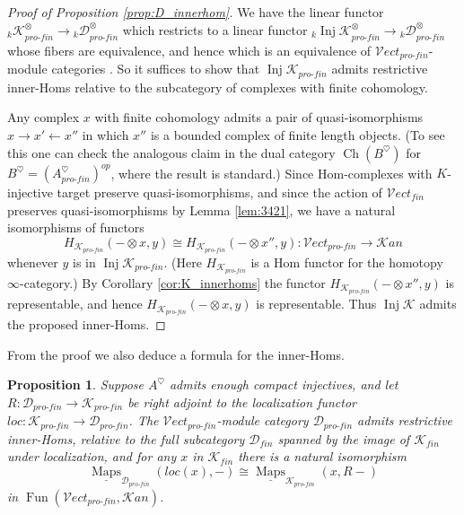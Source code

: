 \documentclass[reqno]{amsart}
\newtheorem{proposition}[lemma]{Proposition}
\theoremstyle{definition}
\newcommand{\msc}[1]{\mathscr{#1}}
\newcommand{\opn}[1]{\operatorname{#1}}
\newcommand{\ot}{\otimes}
\newcommand{\Vect}{\msc{V}\!ect}
\newcommand{\sKan}{\msc{K}\!an}
\newcommand{\pf}{pro\text{-}fin}
\DeclareMathOperator{\Fun}{Fun}
\DeclareMathOperator{\Maps}{Maps}
\renewcommand{\1}{\mathbf{1}}
\begin{document}
\begin{proof}[Proof of Proposition \ref{prop:D_innerhom}]
We have the linear functor ${_k\msc{K}}^{\ot}_{\pf}\to {_k\msc{D}}^{\ot}_{\pf}$ which restricts to a linear functor ${_k\opn{Inj}\msc{K}}^{\ot}_{\pf}\to {_k\msc{D}}^{\ot}_{\pf}$ whose fibers are equivalence, and hence which is an equivalence of $\Vect_{\pf}$-module categories \cite[\href{https://kerodon.net/tag/028C}{028C}]{kerodon}.  So it suffices to show that $\opn{Inj}\msc{K}_{\pf}$ admits restrictive inner-Homs relative to the subcategory of complexes with finite cohomology.
\par

Any complex $x$ with finite cohomology admits a pair of quasi-isomorphisms $x\to x'\leftarrow x''$ in which $x''$ is a bounded complex of finite length objects.  (To see this one can check the analogous claim in the dual category $\opn{Ch}(B^{\heartsuit})$ for $B^{\heartsuit}=(A^{\heartsuit}_{\pf})^{op}$, where the result is standard.)  Since Hom-complexes with $K$-injective target preserve quasi-isomorphisms, and since the action of $\Vect_{fin}$ preserves quasi-isomorphisms by Lemma \ref{lem:3421}, we have a natural isomorphisms of functors
\[
H_{\msc{K}_{\pf}}(-\ot x,y)\cong H_{\msc{K}_{\pf}}(-\ot x'',y):\Vect_{\pf}\to \sKan
\]
whenever $y$ is in $\opn{Inj}\msc{K}_{\pf}$.  (Here $H_{\msc{K}_{\pf}}$ is a Hom functor for the homotopy $\infty$-category.)  By Corollary \ref{cor:K_innerhoms} the functor $H_{\msc{K}_{\pf}}(-\ot x'',y)$ is representable, and hence $H_{\msc{K}_{\pf}}(-\ot x,y)$ is representable.  Thus $\opn{Inj}\msc{K}$ admits the proposed inner-Homs.
\end{proof}

From the proof we also deduce a formula for the inner-Homs.

\begin{proposition}\label{prop:D_innerhom_formula}
Suppose $A^{\heartsuit}$ admits enough compact injectives, and let $R:\msc{D}_{\pf}\to \msc{K}_{\pf}$ be right adjoint to the localization functor $loc:\msc{K}_{\pf}\to \msc{D}_{\pf}$.  The $\Vect_{\pf}$-module category $\msc{D}_{\pf}$ admits restrictive inner-Homs, relative to the full subcategory $\msc{D}_{fin}$ spanned by the image of $\msc{K}_{fin}$ under localization, and for any $x$ in $\msc{K}_{fin}$ there is a natural isomorphism
\[
\underline{\Maps}_{\msc{D}_{\pf}}(loc(x),-)\cong \underline{\Maps}_{\msc{K}_{\pf}}(x,R-)
\]
in $\Fun(\Vect_{\pf},\sKan)$.
\end{proposition}



%
\end{document}
